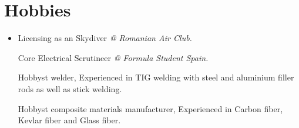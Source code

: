 \documentclass[letterpaper,11pt]{article}
\makeatletter
\newcommand{\resumeOrganizationHeading}[4]{
  \vspace{-2pt}\item
    \begin{tabular*}{0.97\textwidth}[t]{l@{\extracolsep{\fill}}r}
      \textbf{#1} & \textit{\small #2} \\
      \textit{\small#3}
    \end{tabular*}\vspace{-7pt}
}
\newcommand{\resumeSubHeadingListStart}{\begin{itemize}[leftmargin=0.15in, label={}]}
\newcommand{\resumeSubHeadingListEnd}{\end{itemize}}
\makeatother
\begin{document}

\section{Hobbies}
  \resumeSubHeadingListStart

    \item{
      Licensing as an Skydiver \textit{@ Romanian Air Club.}
      
      Core Electrical Scrutineer \textit{@ Formula Student Spain.}
      
      Hobbyst welder, Experienced in TIG welding with steel and aluminium filler rods as well as stick welding.

      Hobbyst composite materials manufacturer, Experienced in Carbon fiber, Kevlar fiber and Glass fiber.
    }

  \resumeSubHeadingListEnd




    
    


\end{document}
